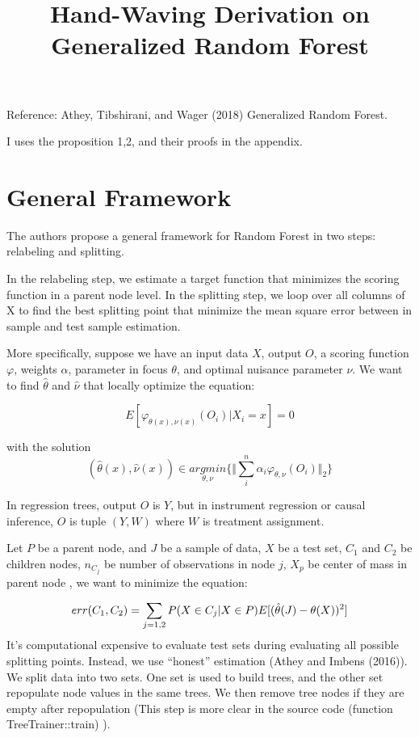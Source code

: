 \documentclass[12pt,letterpaper]{article}
\title{}
\author{}
\begin{document}
\title{Hand-Waving Derivation on Generalized Random Forest}
\maketitle

Reference: Athey, Tibshirani, and Wager (2018) Generalized Random Forest. 

I  uses the proposition 1,2, and their proofs in the appendix. 

\section{General Framework}
The authors propose a general framework for Random Forest in two steps: relabeling and splitting. 

In the relabeling step, we estimate a target function that minimizes the scoring function in a parent node level. In the splitting step, we loop over all columns of X  to find the best splitting point that minimize the mean square error between in sample and test sample estimation. 

More specifically, suppose we have an input data $ X $, output $ O $, a scoring function $\varphi$, weights $ \alpha $, parameter in focus $\theta$, and optimal nuisance parameter $\nu$. We want to find $\hat{\theta}$ and $ \hat{\nu} $ that locally optimize the equation:  

\begin{equation}\label{key}
	E[\varphi_{\theta(x), \nu(x)}(O_{i})|X_{i}=x] = 0
\end{equation}

with the solution 
\begin{equation}
	(\hat{\theta}(x), \hat{\nu}(x)) \in  \underset{\theta, \nu}{argmin} \Big\{ \Vert    \sum_{i}^{n}\alpha_{i}\varphi_{\theta,\nu}(O_{i}) \Vert_{2}  \Big\}
\end{equation}

In regression trees, output $ O $ is $ Y $, but in instrument regression or causal inference, $ O $ is tuple $ (Y, W) $ where $ W $ is treatment assignment.

Let $ P $ be a parent node, and $ J $ be a sample of data, $ X $ be a test set, $ C_{1} $ and $ C_{2} $  be children nodes, $ n_{C_j} $ be number of observations in node $ j $, $ X_p $ be center of mass in parent node , we want to minimize the equation:

\begin{equation}\label{key}
		err(C_1, C_2)   = \sum_{j=1,2}P(X \in C_{j} | X \in P) E[(\hat{\theta}(J) - \theta(X))^2] \\
\end{equation}
It's computational expensive to evaluate test sets during evaluating all possible splitting points. Instead, we use ``honest'' estimation (Athey and Imbens (2016)).   We split data into two sets.  One set is used to build trees, and the other set repopulate node values in the same trees. We then remove tree nodes if they are empty after repopulation (This step is more clear in the source code (function TreeTrainer::train) ).
\end{document}
